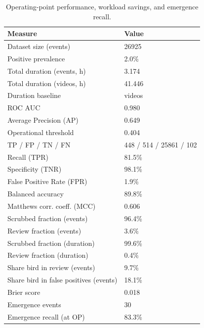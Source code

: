 \begin{table}
\caption{Operating-point performance, workload savings, and emergence recall.}
\label{tab:summary}
\begin{tabular}{ll}
\toprule
Measure & Value \\
\midrule
Dataset size (events) & 26925 \\
Positive prevalence & 2.0\% \\
Total duration (events, h) & 3.174 \\
Total duration (videos, h) & 41.446 \\
Duration baseline & videos \\
ROC AUC & 0.980 \\
Average Precision (AP) & 0.649 \\
Operational threshold & 0.404 \\
TP / FP / TN / FN & 448 / 514 / 25861 / 102 \\
Recall (TPR) & 81.5\% \\
Specificity (TNR) & 98.1\% \\
False Positive Rate (FPR) & 1.9\% \\
Balanced accuracy & 89.8\% \\
Matthews corr. coeff. (MCC) & 0.606 \\
Scrubbed fraction (events) & 96.4\% \\
Review fraction (events) & 3.6\% \\
Scrubbed fraction (duration) & 99.6\% \\
Review fraction (duration) & 0.4\% \\
Share bird in review (events) & 9.7\% \\
Share bird in false positives (events) & 18.1\% \\
Brier score & 0.018 \\
Emergence events & 30 \\
Emergence recall (at OP) & 83.3\% \\
\bottomrule
\end{tabular}
\end{table}
